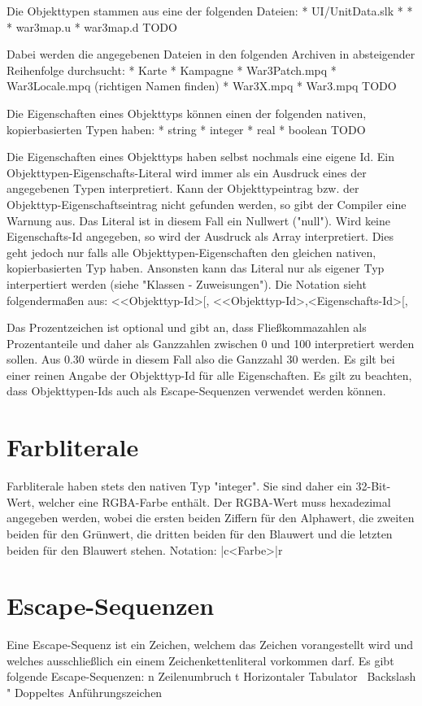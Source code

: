Die Objekttypen stammen aus eine der folgenden Dateien:
* UI/UnitData.slk
*
*
* war3map.u
* war3map.d
TODO

Dabei werden die angegebenen Dateien in den folgenden Archiven in absteigender Reihenfolge durchsucht:
* Karte
* Kampagne
* War3Patch.mpq
* War3Locale.mpq (richtigen Namen finden)
* War3X.mpq
* War3.mpq
TODO

Die Eigenschaften eines Objekttyps können einen der folgenden nativen, kopierbasierten Typen haben:
* string
* integer
* real
* boolean
TODO

Die Eigenschaften eines Objekttyps haben selbst nochmals eine eigene Id.
Ein Objekttypen-Eigenschafts-Literal wird immer als ein Ausdruck eines der angegebenen Typen interpretiert.
Kann der Objekttypeintrag bzw. der Objekttyp-Eigenschaftseintrag nicht gefunden werden, so gibt der Compiler eine Warnung aus.
Das Literal ist in diesem Fall ein Nullwert ("null").
Wird keine Eigenschafts-Id angegeben, so wird der Ausdruck als Array interpretiert. Dies geht jedoch nur falls alle Objekttypen-Eigenschaften
den gleichen nativen, kopierbasierten Typ haben.
Ansonsten kann das Literal nur als eigener Typ interpertiert werden (siehe "Klassen - Zuweisungen").
Die Notation sieht folgendermaßen aus:
<<Objekttyp-Id>[, %
<<Objekttyp-Id>,<Eigenschafts-Id>[, %

Das Prozentzeichen ist optional und gibt an, dass Fließkommazahlen als Prozentanteile und daher als Ganzzahlen zwischen 0 und 100 interpretiert werden
sollen. Aus 0.30 würde in diesem Fall also die Ganzzahl 30 werden.
Es gilt bei einer reinen Angabe der Objekttyp-Id für alle Eigenschaften.
Es gilt zu beachten, dass Objekttypen-Ids auch als Escape-Sequenzen verwendet werden können.

\section{Farbliterale}
Farbliterale haben stets den nativen Typ "integer". Sie sind daher ein 32-Bit-Wert, welcher eine RGBA-Farbe enthält.
Der RGBA-Wert muss hexadezimal angegeben werden, wobei die ersten beiden Ziffern für den Alphawert, die zweiten beiden für den Grünwert,
die dritten beiden für den Blauwert und die letzten beiden für den Blauwert stehen.
Notation:
|c<Farbe>|r

\section{Escape-Sequenzen}
Eine Escape-Sequenz ist ein Zeichen, welchem das \-Zeichen vorangestellt wird und welches ausschließlich ein einem
Zeichenkettenliteral vorkommen darf.
Es gibt folgende Escape-Sequenzen:
n				Zeilenumbruch
t				Horizontaler Tabulator
\				Backslash
"				Doppeltes Anführungszeichen

